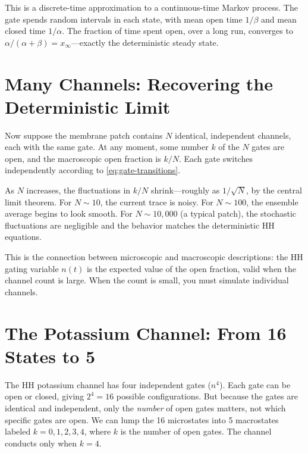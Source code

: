 This is a discrete-time approximation to a continuous-time Markov process. The gate spends random intervals in each state, with mean open time $1/\beta$ and mean closed time $1/\alpha$. The fraction of time spent open, over a long run, converges to $\alpha/(\alpha + \beta) = x_\infty$---exactly the deterministic steady state.

\section{Many Channels: Recovering the Deterministic Limit}
\label{sec:many-channels}

Now suppose the membrane patch contains $N$ identical, independent channels, each with the same gate. At any moment, some number $k$ of the $N$ gates are open, and the macroscopic open fraction is $k/N$. Each gate switches independently according to \cref{eq:gate-transitions}.

As $N$ increases, the fluctuations in $k/N$ shrink---roughly as $1/\sqrt{N}$, by the central limit theorem. For $N \sim 10$, the current trace is noisy. For $N \sim 100$, the ensemble average begins to look smooth. For $N \sim 10{,}000$ (a typical patch), the stochastic fluctuations are negligible and the behavior matches the deterministic HH equations.

This is the connection between microscopic and macroscopic descriptions: the HH gating variable $n(t)$ is the expected value of the open fraction, valid when the channel count is large. When the count is small, you must simulate individual channels.

\section{The Potassium Channel: From 16 States to 5}
\label{sec:k-channel-markov}

The HH potassium channel has four independent gates ($n^4$). Each gate can be open or closed, giving $2^4 = 16$ possible configurations. But because the gates are identical and independent, only the \emph{number} of open gates matters, not which specific gates are open. We can lump the 16 microstates into 5 macrostates labeled $k = 0, 1, 2, 3, 4$, where $k$ is the number of open gates. The channel conducts only when $k = 4$.

